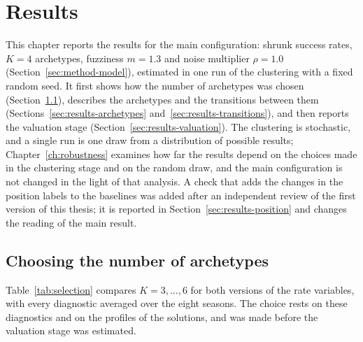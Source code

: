\chapter{Results}
\label{ch:results}

This chapter reports the results for the main configuration: shrunk success rates, $K=4$ archetypes, fuzziness $m=1.3$ and noise multiplier $\rho=1.0$ (Section~\ref{sec:method-model}), estimated in one run of the clustering with a fixed random seed. It first shows how the number of archetypes was chosen (Section~\ref{sec:results-selection}), describes the archetypes and the transitions between them (Sections~\ref{sec:results-archetypes} and~\ref{sec:results-transitions}), and then reports the valuation stage (Section~\ref{sec:results-valuation}). The clustering is stochastic, and a single run is one draw from a distribution of possible results; Chapter~\ref{ch:robustness} examines how far the results depend on the choices made in the clustering stage and on the random draw, and the main configuration is not changed in the light of that analysis. A check that adds the changes in the position labels to the baselines was added after an independent review of the first version of this thesis; it is reported in Section~\ref{sec:results-position} and changes the reading of the main result.

\section{Choosing the number of archetypes}
\label{sec:results-selection}

Table~\ref{tab:selection} compares $K=3,\dots,6$ for both versions of the rate variables, with every diagnostic averaged over the eight seasons. The choice rests on these diagnostics and on the profiles of the solutions, and was made before the valuation stage was estimated.

